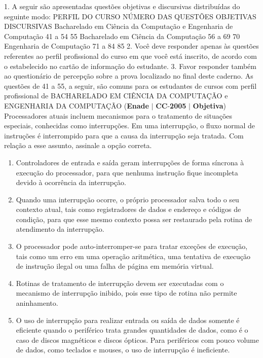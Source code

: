 \documentclass{exam}
\begin{document}
\begin{questions}
1. A seguir são apresentadas questões objetivas e discursivas distribuídas do seguinte modo:
PERFIL DO CURSO
NÚMERO DAS QUESTÕES
OBJETIVAS DISCURSIVAS
Bacharelado em Ciência da Computação e
Engenharia de Computação
41 a 54 55
Bacharelado em Ciência da Computação 56 a 69 70
Engenharia de Computação 71 a 84 85
2. Você deve responder apenas às questões referentes ao perfil profissional do curso em que
você está inscrito, de acordo com o estabelecido no cartão de informação do estudante.
3. Favor responder também ao questionário de percepção sobre a prova localizado no final
deste caderno.
As questões de 41 a 55, a seguir, são comuns para os estudantes de cursos com perfil profissional de
BACHARELADO EM CIÊNCIA DA COMPUTAÇÃO e ENGENHARIA DA COMPUTAÇÃO
\question (\textbf{Enade} $|$ \textbf{CC}-\textbf{2005} $|$ \textbf{Objetiva})
Processadores atuais incluem mecanismos para o tratamento
de situações especiais, conhecidas como interrupções. Em uma
interrupção, o fluxo normal de instruções é interrompido para
que a causa da interrupção seja tratada. Com relação a esse
assunto, assinale a opção correta.
	\begin{enumerate}[label=\alph*)]
		\item  Controladores de entrada e saída geram interrupções de
forma síncrona à execução do processador, para que
nenhuma instrução fique incompleta devido à ocorrência
da interrupção.
		\item  Quando uma interrupção ocorre, o próprio processador
salva todo o seu contexto atual, tais como registradores de
dados e endereço e códigos de condição, para que esse
mesmo contexto possa ser restaurado pela rotina de
atendimento da interrupção.
		\item  O processador pode auto-interromper-se para tratar
exceções de execução, tais como um erro em uma
operação aritmética, uma tentativa de execução de
instrução ilegal ou uma falha de página em memória
virtual.
		\item  Rotinas de tratamento de interrupção devem ser executadas
com o mecanismo de interrupção inibido, pois esse tipo de
rotina não permite aninhamento.
		\item  O uso de interrupção para realizar entrada ou saída de
dados somente é eficiente quando o periférico trata
grandes quantidades de dados, como é o caso de discos
magnéticos e discos ópticos. Para periféricos com pouco
volume de dados, como teclados e mouses, o uso de
interrupção é ineficiente.
	\end{enumerate}


\end{questions}
\end{document}
